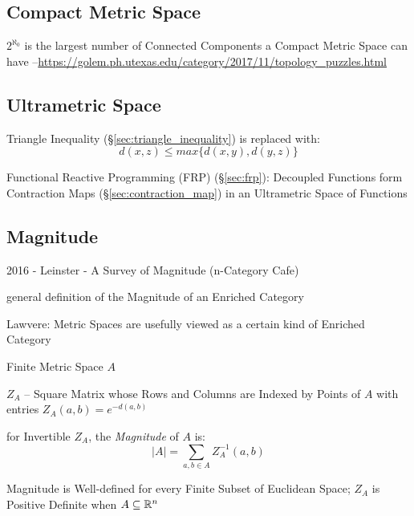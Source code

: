 \subsection{Compact Metric Space}\label{sec:compact_metric_space}

$2^{\aleph_0}$ is the largest number of Connected Components a Compact Metric
Space can have
--\url{https://golem.ph.utexas.edu/category/2017/11/topology_puzzles.html}



\subsection{Ultrametric Space}\label{sec:ultrametric_space}

Triangle Inequality (\S\ref{sec:triangle_inequality}) is replaced
with:
\[
  d(x,z) \leq max\{d(x,y),d(y,z)\}
\]

Functional Reactive Programming (FRP) (\S\ref{sec:frp}): Decoupled
Functions form Contraction Maps (\S\ref{sec:contraction_map}) in an
Ultrametric Space of Functions



\subsection{Magnitude}\label{sec:magnitude}

2016 - Leinster - A Survey of Magnitude (n-Category Cafe) %

general definition of the Magnitude of an Enriched Category %

Lawvere: Metric Spaces are usefully viewed as a certain kind of
Enriched Category

Finite Metric Space $A$

$Z_A$ -- Square Matrix whose Rows and Columns are Indexed by Points of
$A$ with entries $Z_A(a,b) = e^{-d(a,b)}$

for Invertible $Z_A$, the \emph{Magnitude} of $A$ is:
\[
  |A| = \sum_{a,b \in A} Z^{-1}_A (a,b)
\]

Magnitude is Well-defined for every Finite Subset of Euclidean Space;
$Z_A$ is Positive Definite when $A \subseteq \mathbb{R}^n$

